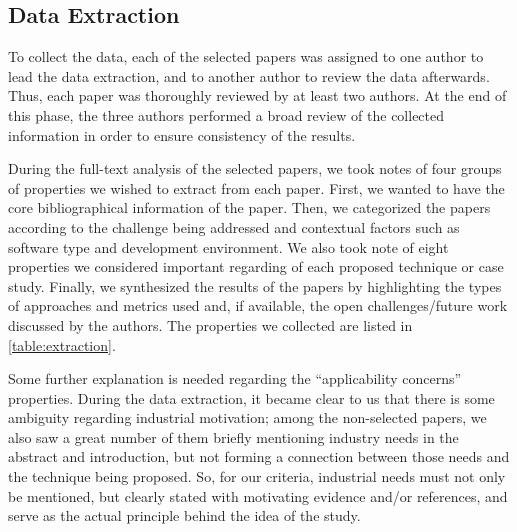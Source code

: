 
%

\subsection{Data Extraction}
\label{subsec:extraction}


To collect the data, each of the selected papers was assigned to one author to lead the data extraction, and to another author to review the data afterwards.
Thus, each paper was thoroughly reviewed by at least two authors.
At the end of this phase, the three authors performed a broad review of the collected information in order to ensure consistency of the results.

During the full-text analysis of the selected papers, we took notes of four groups of properties we wished to extract from each paper.
First, we wanted to have the core bibliographical information of the paper.
Then, we categorized the papers according to the \rt challenge being addressed and contextual factors such as software type and development environment.
We also took note of eight properties we considered important regarding \rea of each proposed technique or case study.
Finally, we synthesized the results of the papers by highlighting the types of approaches and metrics used and, if available, the open challenges/future work discussed by the authors.
The properties we collected are listed in \autoref{table:extraction}.

Some further explanation is needed regarding the ``applicability concerns'' properties.
During the data extraction, it became clear to us that there is some ambiguity regarding industrial motivation; among the non-selected papers, we also saw a great number of them briefly mentioning industry needs in the abstract and introduction, but not forming a connection between those needs and the technique being proposed.
So, for our criteria, industrial needs must not only be mentioned, but clearly stated with motivating evidence and/or references, and serve as the actual principle behind the idea of the study.

